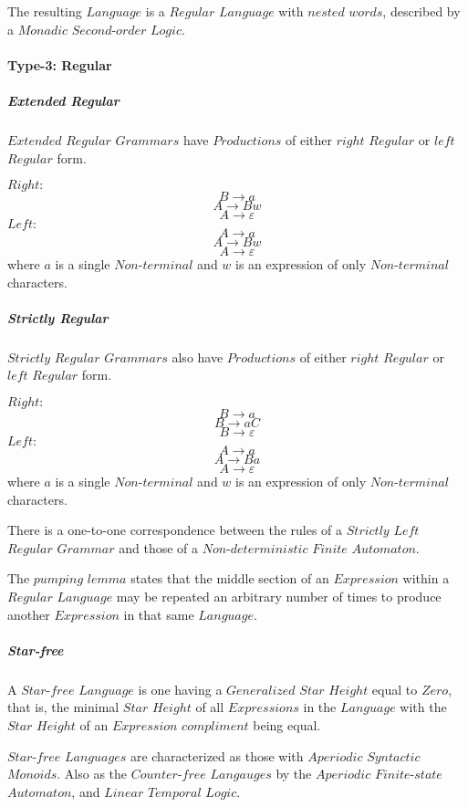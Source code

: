 \documentclass{article}
\begin{document}
    The resulting $Language$ is a $Regular$ $Language$ with $nested$
    $words$, described by a $Monadic$ $Second$-$order$ $Logic$.

\paragraph{Type-3: Regular}

    \subparagraph{Extended Regular}
    $Extended$ $Regular$ $Grammars$ have $Productions$ of either
    $right$ $Regular$ or $left$ $Regular$ form.

    $Right:$
    \[
        B \rightarrow a
    \]\[
        A \rightarrow Bw
    \]\[
        A \rightarrow \varepsilon
    \]
    $Left:$
    \[
        A \rightarrow a
    \]\[
        A \rightarrow Bw
    \]\[
        A \rightarrow \varepsilon
    \]
    where $a$ is a single $Non$-$terminal$ and $w$ is an expression of
    only $Non$-$terminal$ characters.

    \subparagraph{Strictly Regular}
    $Strictly$ $Regular$ $Grammars$ also have $Productions$ of either
    $right$ $Regular$ or $left$ $Regular$ form.

    $Right:$
    \[
        B \rightarrow a
    \]\[
        B \rightarrow aC
    \]\[
        B \rightarrow \varepsilon
    \]
    $Left:$
    \[
        A \rightarrow a
    \]\[
        A \rightarrow Ba
    \]\[
        A \rightarrow \varepsilon
    \]
    where $a$ is a single $Non$-$terminal$ and $w$ is an expression of
    only $Non$-$terminal$ characters.

    There is a one-to-one correspondence between the rules of a
    $Strictly$ $Left$ $Regular$ $Grammar$ and those of a
    $Non$-$deterministic$ $Finite$ $Automaton$.

    The $pumping$ $lemma$ states that the middle section of an
    $Expression$ within a $Regular$ $Language$ may be repeated an
    arbitrary number of times to produce another $Expression$ in that
    same $Language$.

    \subparagraph{Star-free}
    A $Star$-$free$ $Language$ is one having a $Generalized$ $Star$
    $Height$ equal to $Zero$, that is, the minimal $Star$ $Height$ of
    all $Expressions$ in the $Language$ with the $Star$ $Height$ of an
    $Expression$ $compliment$ being equal.

    $Star$-$free$ $Languages$ are characterized as those with
    $Aperiodic$ $Syntactic$ $Monoids$. Also as the $Counter$-$free$
    $Langauges$ by the $Aperiodic$ $Finite$-$state$ $Automaton$, and
    $Linear$ $Temporal$ $Logic$.
\end{document}
